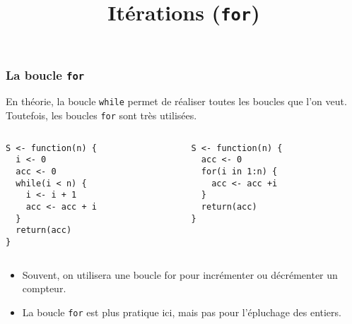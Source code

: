 \documentclass[10pt]{beamer}
\title{Itérations (\texttt{for})}
\begin{document}
\maketitle





\begin{frame}[fragile]
  \frametitle{La boucle \texttt{for}}

  En théorie, la boucle \texttt{while} permet de réaliser toutes les boucles que l'on veut.
  Toutefois, les boucles \texttt{for} sont très utilisées.


\begin{columns}[t]
\begin{column}{0.48\textwidth}
  \begin{lstlisting}[style=editor]
S <- function(n) {
  i <- 0
  acc <- 0
  while(i < n) {
    i <- i + 1
    acc <- acc + i
  }
  return(acc)
}
\end{lstlisting}
\end{column}
\begin{column}{0.43\textwidth}
\begin{lstlisting}[style=editor]
S <- function(n) {
  acc <- 0
  for(i in 1:n) {
    acc <- acc +i
  }
  return(acc)
}
\end{lstlisting}
\end{column}
\end{columns}

\begin{itemize}
\item Souvent, on utilisera une boucle for pour incrémenter ou décrémenter un compteur.
\item La boucle \texttt{for} est plus pratique ici, mais pas pour l'épluchage des entiers.

\end{itemize}
\end{frame}
\end{document}
